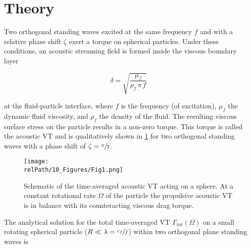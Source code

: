 \section{Theory \label{sec:VT-theory}}

Two orthogonal standing waves excited at the same frequency $f$ and with a 
relative phase shift $\zeta$ exert a torque on spherical particles. Under these 
conditions, an acoustic streaming field is formed inside the viscous boundary 
layer

\begin{equation}
    \delta = \sqrt{\frac{\mu_{f}}{\rho_{f}\,\pi\,f}}
    \label{eq:VT-delta}
\end{equation}

at the fluid-particle interface, where $f$ is the frequency (of excitation), 
$\mu_{f}$ the dynamic fluid viscosity, and $\rho_{f}$ the density of the fluid. 
The resulting viscous surface stress on the particle results in a non-zero 
torque. This torque is called the acoustic VT and is qualitatively shown in 
\cref{fig:VT-Fig1} for two orthogonal standing waves with a phase shift of 
$\zeta = \sfrac{\pi}{2}$.

\begin{figure}
    \centering
    \texttt{[image: \\relPath/10\_Figures/Fig1.png]}
    \caption{Schematic of the time-averaged acoustic VT acting on a sphere. At a 
    constant rotational rate $\Omega$ of the particle the propulsive acoustic 
  VT is in balance with its counteracting viscous drag 
  torque.\label{fig:VT-Fig1}}
\end{figure}%

The analytical solution for the total time-averaged VT 
$\Gamma_{\text{tot}}(\Omega)$ on a small rotating spherical particle 
($R\ll\lambda=\sfrac{c_f}{f}$) within two orthogonal plane standing waves is 


